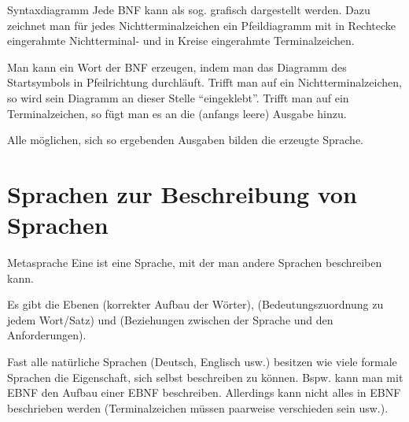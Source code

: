 \begin{Def}{Syntaxdiagramm}
    Jede BNF kann als sog.  grafisch dargestellt
    werden. Dazu zeichnet man für jedes Nichtterminalzeichen ein Pfeildiagramm
    mit in Rechtecke eingerahmte Nichtterminal- und in Kreise eingerahmte
    Terminalzeichen.

    Man kann ein Wort der BNF erzeugen, indem man das Diagramm des
    Startsymbols in Pfeilrichtung durchläuft. Trifft man auf ein
    Nichtterminalzeichen, so wird sein Diagramm an dieser Stelle
    "`eingeklebt"'. Trifft man auf ein Terminalzeichen, so fügt man es an die
    (anfangs leere) Ausgabe hinzu.

    Alle möglichen, sich so ergebenden Ausgaben bilden die erzeugte Sprache.
\end{Def}

\section{%
    Sprachen zur Beschreibung von Sprachen%
}

\begin{Def}{Metasprache}
    Eine  ist eine Sprache, mit der man andere Sprachen
    beschreiben kann.

    Es gibt die Ebenen  (korrekter Aufbau der Wörter),
     (Bedeutungszuordnung zu jedem Wort/Satz) und
     (Beziehungen zwischen der Sprache und den
    Anforderungen).

    Fast alle natürliche Sprachen (Deutsch, Englisch usw.) besitzen wie viele
    formale Sprachen die Eigenschaft, sich selbst beschreiben zu können.
    Bspw. kann man mit EBNF den Aufbau einer EBNF beschreiben.
    Allerdings kann nicht alles in EBNF beschrieben werden
    (Terminalzeichen müssen paarweise verschieden sein usw.).
\end{Def}

\pagebreak
